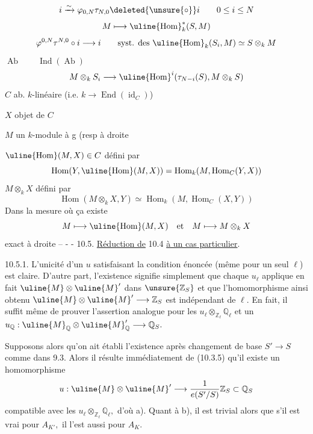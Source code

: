 \[
i\xrightarrow{\sim}\varphi_{0,N}\tau_{N,0}\deleted{\unsure{\circ}}i\qquad0\leq i\leq N
\]
\diagram{\begin{array}{ccc}
&(x_k)_{k\geq N}\mathrel{\substack{\longrightarrow\\[-.4em]\longrightarrow}}&\unsure{c_{\ell,k}}x_k-c_{\ell,k-i}x_{k+\ell}\\
M\lhook\joinrel\longrightarrow&M^{[N,+\infty[}&\mathrel{\substack{\longrightarrow\\[-.4em]\longrightarrow}}M^{[N,+\infty]\times\mathbb N}\\
x\longmapsto&(c_{i,k-i}x)_{k\geq N}&
\end{array}}
\[
M\longmapsto\uline{\operatorname{Hom}}_k^*(S,M)
\]
\[
\varphi^{0,N}\tau^{N,0}\circ i\longrightarrow i
\qquad\text{syst. des }\uline{\operatorname{Hom}}_k(S_i,M)\simeq S\otimes_k M
\]
\(\operatorname{Ab}\qquad\operatorname{Ind}(\operatorname{Ab})\)
\[
M\otimes_k S_i\longrightarrow\uline{\operatorname{Hom}}^i(\tau_{N-i}(S),M\otimes_k S)
\]
\(C\)  ab. \(k\)-linéaire (i.e. \(k\longrightarrow\operatorname{End}(\operatorname{id}_C)\))

\(X\) objet de \(C\)

\(M\) un \(k\)-module à g (resp à droite

\(\uline{\operatorname{Hom}}(M,X)\in C\) défini par
\[
\operatorname{Hom}(Y,\uline{\operatorname{Hom}}(M,X))=
\operatorname{Hom}_k(M,\operatorname{Hom}_C(Y,X))
\]
\(M\otimes_k X\) défini par
\[
\operatorname{Hom}(M\otimes_k X,Y)\simeq\operatorname{Hom}_k(M,\operatorname{Hom}_C(X,Y))
\]
Dans la mesure où ça existe
\[
M\longmapsto\uline{\operatorname{Hom}}(M,X)\quad\text{et}\quad M\longmapsto M\otimes_k X
\]
 exact à droite --
-  -
10.5. \uline{Réduction de} 10.4 \uline{à un cas particulier}.

10.5.1. L'unicité d'un \(u\) satisfaisant la condition énoncée (même pour un seul \(\ell\)) est claire. D'autre part, l'existence signifie simplement que chaque \(u_\ell\) applique en fait \(\uline{M}\otimes\uline{M}'\) dans \(\unsure{\mathbb Z_S}\) et que l'homomorphisme ainsi obtenu \(\uline{M}\otimes\uline{M}'\longrightarrow\mathbb Z_S\) est indépendant de \(\ell.\) En fait, il suffit même de prouver l'assertion analogue pour les \(u_\ell\otimes_{\mathbb Z_\ell}\mathbb Q_\ell\) et un \(u_{\mathbb Q}:\uline{M}_{\mathbb Q}\otimes\uline{M}'_{\mathbb Q}\longrightarrow\mathbb Q_S.\)

Supposons alors qu'on ait établi l'existence après changement de base \(S'\longrightarrow S\) comme dans 9.3. Alors il résulte immédiatement de (10.3.5) qu'il existe un homomorphisme
\[
u:\uline{M}\otimes\uline{M}'\longrightarrow\frac{1}{e(S'/S)}\mathbb Z_S\subset\mathbb Q_S
\]
compatible avec les \(u_\ell\otimes_{\mathbb Z_\ell}\mathbb Q_\ell,\) d'où a). Quant à b), il est trivial alors que s'il est vrai pour \(A_{K'},\) il l'est aussi pour \(A_K.\)

